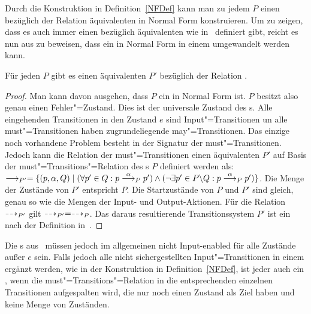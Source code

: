 Durch die Konstruktion in Definition~\ref{NFDef} kann man zu jedem \MEIO{} $P$
einen bezüglich der Relation \ERel{} äquivalenten \MEIO{} in Normal Form
konstruieren. Um zu zeigen, dass es auch immer einen bezüglich \ERel{}
äquivalenten \MIA{} wie in~\cite{Vogler2016MIA3} definiert gibt, reicht es nun
aus zu beweisen, dass ein \MEIO{} in Normal Form in einem \MIA{} umgewandelt
werden kann.

\begin{Satz}
  Für jeden \MEIO{} $P$ gibt es einen äquivalenten \MIA{} $P'$ bezüglich der
  Relation \ERel{}.
\end{Satz}
\begin{proof}
  Man kann \oBdA{} davon ausgehen, dass $P$ ein \MEIO{} in Normal Form ist. $P$
  besitzt also genau einen Fehler"=Zustand. Dies ist der universale Zustand des
  \MIA{}s. Alle eingehenden Transitionen in den Zustand $e$ sind
  Input"=Transitionen un alle must"=Transitionen haben zugrundeliegende
  may"=Transitionen. Das einzige noch vorhandene Problem besteht in der Signatur
  der must"=Transitionen. Jedoch kann die Relation der must"=Transitionen einen
  äquivalenten \MIA{} $P'$ auf Basis der must"=Transitions"=Relation des
  \MEIO{}s $P$ definiert werden als: $\must _{P'} = \{(p, \alpha , Q) \mid
  (\forall p' \in Q: p \must[\alpha]_P p') \land (\neg \exists p' \in P
  \backslash Q: p \must[\alpha]_P p')\}$. Die Menge der Zustände von $P'$
  entspricht $P$. Die Startzustände von $P$ und $P'$ sind gleich, genau so wie
  die Mengen der Input- und Output-Aktionen. Für die Relation $\may _{P'}$ gilt
  $\may _{P'} = \may _{P}$. Das daraus resultierende Transitionssystem $P'$ ist
  ein \MIA{} nach der Definition in~\cite{Vogler2016MIA3}.
\end{proof}

Die \MIA{}s aus~\cite{Vogler2016MIA3} müssen jedoch im allgemeinen nicht
Input-enabled für alle Zustände außer $e$ sein. Falls jedoch alle nicht
sichergestellten Input"=Transitionen in einem \MIA{} ergänzt werden, wie in der
Konstruktion in Definition~\ref{NFDef}, ist jeder \MIA{} auch ein \MEIO{}, wenn
die must"=Transitions"=Relation in die entsprechenden einzelnen Transitionen
aufgespalten wird, die nur noch einen Zustand als Ziel haben und keine Menge
von Zuständen.
